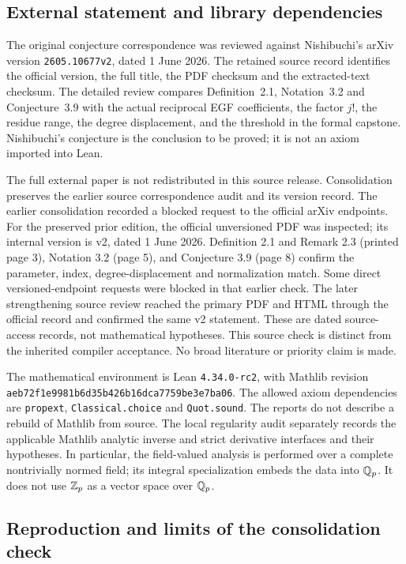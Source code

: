 \subsection{External statement and library dependencies}

The original conjecture correspondence was reviewed against Nishibuchi's
arXiv version \texttt{2605.10677v2}, dated 1 June 2026. The retained source
record identifies the official version, the full title, the PDF checksum and
the extracted-text checksum. The detailed review compares Definition~2.1,
Notation~3.2 and Conjecture~3.9 with the actual reciprocal EGF coefficients,
the factor $j!$, the residue range, the degree displacement, and the threshold
in the formal capstone. Nishibuchi's conjecture is the conclusion to be
proved; it is not an axiom imported into Lean.

The full external paper is not redistributed in this source release.
Consolidation preserves the earlier source correspondence audit and its
version record. The earlier consolidation recorded a blocked request to the official arXiv endpoints.
For the preserved prior edition, the official unversioned PDF was inspected;
its internal version is v2, dated 1 June 2026. Definition 2.1 and Remark 2.3
(printed page 3), Notation 3.2 (page 5), and Conjecture 3.9 (page 8)
confirm the parameter, index, degree-displacement and normalization match.
Some direct versioned-endpoint requests were blocked in that earlier check. The later strengthening source review reached the primary PDF and HTML through the official record and confirmed the same v2 statement. These are dated source-access records, not mathematical hypotheses.
This source check is distinct from the inherited compiler acceptance.
No broad literature or priority claim is made.

The mathematical environment is Lean \texttt{4.34.0-rc2}, with Mathlib revision
\nolinkurl{aeb72f1e9981b6d35b426b16dca7759be3e7ba06}.
The allowed axiom dependencies are
\texttt{propext}, \texttt{Classical.choice} and \texttt{Quot.sound}.
The reports do not describe a rebuild of Mathlib from source. The local
regularity audit separately records the applicable Mathlib analytic inverse
and strict derivative interfaces and their hypotheses. In particular, the
field-valued analysis is performed over a complete nontrivially normed field;
its integral specialization embeds the data into $\mathbb Q_p$. It does not use
$\mathbb Z_p$ as a vector space over $\mathbb Q_p$.

\subsection{Reproduction and limits of the consolidation check}

